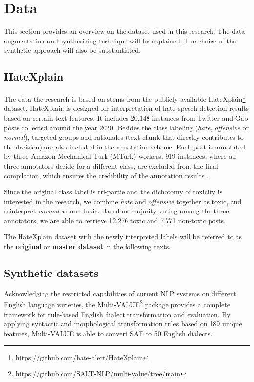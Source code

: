 \documentclass[11pt]{article}
\begin{document}
\section{Data}

This section provides an overview on the dataset used in this research. The data augmentation and synthesizing technique will be explained. The choice of the synthetic approach will also be substantiated.

\subsection{HateXplain}

The data the research is based on stems from the publicly available HateXplain\footnote{\url{https://github.com/hate-alert/HateXplain}} dataset. HateXplain is designed for interpretation of hate speech detection results based on certain text features. It includes 20,148 instances from Twitter and Gab posts collected around the year 2020. Besides the class labeling (\textit{hate}, \textit{offensive} or \textit{normal}), targeted groups and rationales (text chunk that directly contributes to the decision) are also included in the annotation scheme. Each post is annotated by three Amazon Mechanical Turk (MTurk) workers. 919 instances, where all three annotators decide for a different class, are excluded from the final compilation, which ensures the credibility of the annotation results \citep{mathew-2021-hatexplain}.

Since the original class label is tri-partie and the dichotomy of toxicity is interested in the research, we combine \textit{hate} and \textit{offensive} together as toxic, and reinterpret \textit{normal} as non-toxic. Based on majority voting among the three annotators, we are able to retrieve 12,276 toxic and 7,771 non-toxic posts.

The HateXplain dataset with the newly interpreted labels will be referred to as the \textbf{original} or \textbf{master dataset} in the following texts.

\subsection{Synthetic datasets}

Acknowledging the restricted capabilities of current NLP systems on different English language varieties, the Multi-VALUE\footnote{\url{https://github.com/SALT-NLP/multi-value/tree/main}} package \citep{ziems-2023-multi} provides a complete framework for rule-based English dialect transformation and evaluation. By applying syntactic and morphological transformation rules based on 189 unique features, Multi-VALUE is able to convert SAE to 50 English dialects.
\end{document}
